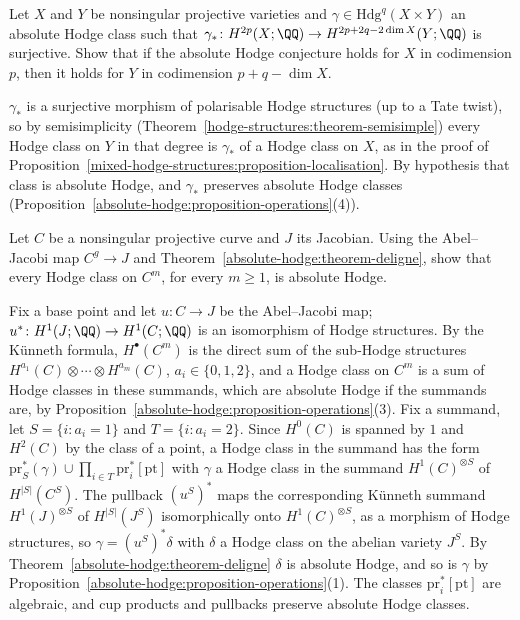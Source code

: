 \begin{exercise}\label{absolute-hodge:exercise-correspondence}
Let $X$ and $Y$ be nonsingular projective varieties and $\gamma \in \mathrm{Hdg}^q(X \times Y)$ an absolute Hodge class such that $\gamma_* \colon H^{2p}(X; \QQ) \to H^{2p+2q-2\dim X}(Y; \QQ)$ is surjective.
Show that if the absolute Hodge conjecture holds for $X$ in codimension $p$, then it holds for $Y$ in codimension $p + q - \dim X$.
\end{exercise}

\begin{solution}
$\gamma_*$ is a surjective morphism of polarisable Hodge structures (up to a Tate twist), so by semisimplicity (Theorem~\ref{hodge-structures:theorem-semisimple}) every Hodge class on $Y$ in that degree is
$\gamma_*$ of a Hodge class on $X$, as in the proof of Proposition~\ref{mixed-hodge-structures:proposition-localisation}. By hypothesis that class is absolute Hodge, and $\gamma_*$ preserves absolute Hodge classes
(Proposition~\ref{absolute-hodge:proposition-operations}(4)).
\end{solution}

\begin{exercise}\label{absolute-hodge:exercise-product-abelian}
Let $C$ be a nonsingular projective curve and $J$ its Jacobian. Using the Abel--Jacobi map $C^g \to J$ and Theorem~\ref{absolute-hodge:theorem-deligne}, show that every Hodge class on $C^m$, for every
$m \geq 1$, is absolute Hodge.
\end{exercise}

\begin{solution}
Fix a base point and let $u \colon C \to J$ be the Abel--Jacobi map; $u^* \colon H^1(J; \QQ) \to H^1(C; \QQ)$ is an isomorphism of Hodge structures. By the K\"unneth formula, $H^\bullet(C^m)$ is the direct sum of the
sub-Hodge structures $H^{a_1}(C) \otimes \cdots \otimes H^{a_m}(C)$, $a_i \in \{0, 1, 2\}$, and a Hodge class on $C^m$ is a sum of Hodge classes in these summands, which are absolute Hodge if the summands are,
by Proposition~\ref{absolute-hodge:proposition-operations}(3). Fix a summand, let $S = \{i : a_i = 1\}$ and $T = \{i : a_i = 2\}$. Since $H^0(C)$ is spanned by $1$ and $H^2(C)$ by the class of a point, a Hodge class in
the summand has the form $\mathrm{pr}_S^*(\gamma) \cup \prod_{i \in T}\mathrm{pr}_i^*[\mathrm{pt}]$ with $\gamma$ a Hodge class in the summand $H^1(C)^{\otimes S}$ of $H^{|S|}(C^S)$. The pullback $(u^S)^*$ maps the
corresponding K\"unneth summand $H^1(J)^{\otimes S}$ of $H^{|S|}(J^S)$ isomorphically onto $H^1(C)^{\otimes S}$, as a morphism of Hodge structures, so $\gamma = (u^S)^*\delta$ with $\delta$ a Hodge class on the abelian
variety $J^S$. By Theorem~\ref{absolute-hodge:theorem-deligne} $\delta$ is absolute Hodge, and so is $\gamma$ by Proposition~\ref{absolute-hodge:proposition-operations}(1). The classes $\mathrm{pr}_i^*[\mathrm{pt}]$ are
algebraic, and cup products and pullbacks preserve absolute Hodge classes.
\end{solution}

